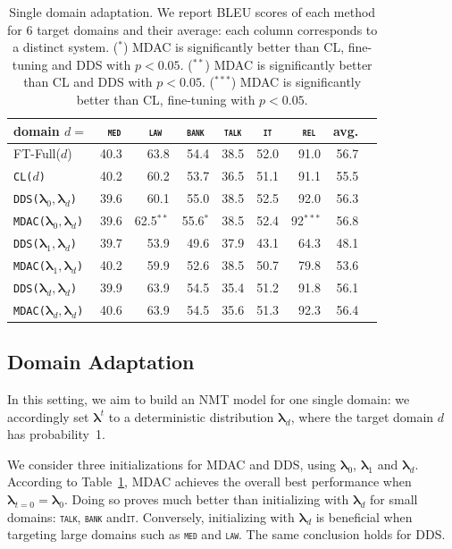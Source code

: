 \documentclass[11pt]{article}
\newcommand{\domain}[1]{\texttt{\textsc{#1}}}
\newcommand{\system}[1]{\texttt{{#1}}}
\newcommand{\vlambda}{\ensuremath{\boldsymbol\lambda}\xspace} %
\begin{document}
\begin{table}[htbp]
  \centering \small
  \begin{tabular}{|l|*8{r|}} \hline
    domain \hfill $d=$ & \multicolumn{1}{c|}{\domain{ med}} & \multicolumn{1}{c|}{\domain{ law}} & \multicolumn{1}{c|}{\domain{bank}} & \multicolumn{1}{c|}{\domain{talk}} & \multicolumn{1}{c|}{\domain{ it }} & \multicolumn{1}{c|}{\domain{ rel}} & \multicolumn{1}{c|}{avg.} \\ \hline
    FT-Full($d$) &40.3&63.8&54.4&38.5&52.0&91.0&56.7\\ \hline
    \hline
    \system{CL($d$)} &40.2&60.2&53.7&36.5&51.1&91.1&55.5\\ \hline
    \system{DDS($\vlambda_0, \vlambda_d$)} &39.6&60.1&55.0&38.5&52.5&92.0&56.3\\
    \system{MDAC($\vlambda_0, \vlambda_d$)} &39.6&62.5$^{**}$&55.6$^{*}$&38.5&52.4&92$^{***}$&56.8\\
     \hline
    \system{DDS($\vlambda_1, \vlambda_d$)} &39.7&53.9&49.6&37.9&43.1&64.3&48.1\\
    \system{MDAC($\vlambda_1, \vlambda_d$)} &40.2&59.9&52.6&38.5&50.7&79.8&53.6\\ \hline
    \system{DDS($\vlambda_d, \vlambda_d$)} &39.9&63.9&54.5&35.4&51.2&91.8&56.1\\
    \system{MDAC($\vlambda_d, \vlambda_d$)}&40.6&63.9&54.5&35.6&51.3&92.3&56.4\\
    \hline
  \end{tabular}
  \caption{Single domain adaptation. We report BLEU scores of each method for 6 target domains and their average: each column corresponds to a distinct system. ($^{*}$) MDAC is significantly better than CL, fine-tuning and DDS with $p<0.05$. ($^{**}$) MDAC is significantly better than CL and DDS with $p<0.05$. ($^{***}$) MDAC is significantly better than CL, fine-tuning with $p<0.05$.} \vspace{-\baselineskip}
  \label{tab:da}
\end{table}
\subsection{Domain Adaptation}\label{ssec:da}
In this setting, we aim to build an NMT model for one single domain: we accordingly set $\vlambda^t$ to a deterministic distribution $\vlambda_d$, where the target domain $d$ has probability~1.

We consider three initializations for MDAC and DDS, using $\vlambda_0$, $\vlambda_1$ and $\vlambda_d$. According to Table~\ref{tab:da}, MDAC achieves the overall best performance when $\vlambda_{t=0} = \vlambda_0$.  Doing so proves much better than initializing with $\vlambda_d$ for small domains: \domain{talk}, \domain{bank} and\domain{it}. Conversely, initializing with $\vlambda_d$ is beneficial when targeting large domains such as \domain{med} and \domain{law}. The same conclusion holds for DDS. 
\end{document}

